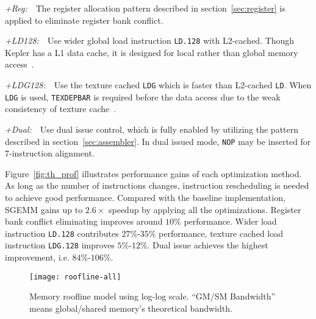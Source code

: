 {\it +Reg:}~~The register allocation pattern described in section~\ref{sec:register} is applied to eliminate register bank conflict. 

{\it +LD128:}~~Use wider global load instruction {\tt LD.128} with L2-cached.
Though Kepler has a L1 data cache, it is designed for local rather than global memory access~\cite{gk110}.

{\it +LDG128:}~~Use the texture cached {\tt LDG} which is faster than L2-cached {\tt LD}. 
When {\tt LDG} is used, {\tt TEXDEPBAR} is required before the data access due to the weak consistency of texture cache~\cite{lukyanov2014efficient}.

{\it +Dual:}~~Use dual issue control, which is fully enabled by utilizing the pattern described in section~\ref{sec:assembler}.
In dual issued mode, {\tt NOP} may be inserted for 7-instruction alignment.

Figure~\ref{fig:th_prof} illustrates performance gains of each optimization method.
As long as the number of instructions changes, instruction rescheduling is needed to achieve good performance.
Compared with the baseline implementation, SGEMM gains up to $2.6\times$ speedup by applying all the optimizations.
Register bank conflict eliminating improves around $10\%$ performance. 
Wider load instruction {\tt LD.128} contributes $27\%$-$35\%$ performance, texture cached
load instruction {\tt LDG.128} improves $5\%$-$12\%$.
Dual issue achieves the highest improvement, i.e. $84\%$-$106\%$.


\begin{figure}[htbp]
\begin{center}
\texttt{[image: roofline-all]}
    \caption{Memory roofline model using log-log scale. ``GM/SM Bandwidth'' means global/shared memory's theoretical
    bandwidth.} %
\label{fig:roofline_global}
\end{center}
\end{figure}



